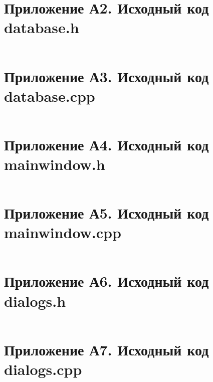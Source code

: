 \documentclass[oneside,a4paper,14pt]{extarticle}
\begin{document}
\section*{Приложение А2. Исходный код database.h}
\inputminted{cpp}{code/src/database.h}

\section*{Приложение А3. Исходный код database.cpp}
\inputminted{cpp}{code/src/database.cpp}

\section*{Приложение А4. Исходный код mainwindow.h}
\inputminted{cpp}{code/src/mainwindow.h}

\section*{Приложение А5. Исходный код mainwindow.cpp}
\inputminted{cpp}{code/src/mainwindow.cpp}

\section*{Приложение А6. Исходный код dialogs.h}
\inputminted{cpp}{code/src/dialogs.h}

\section*{Приложение А7. Исходный код dialogs.cpp}
\inputminted{cpp}{code/src/dialogs.cpp}
\end{document}
